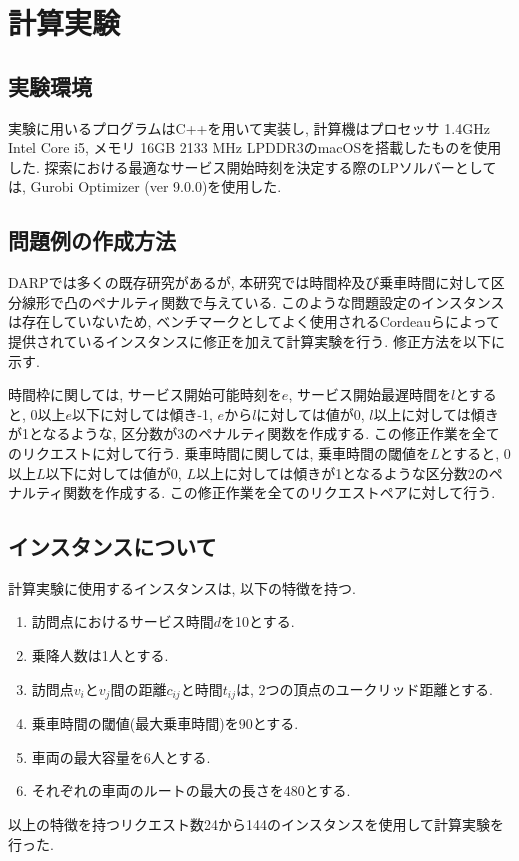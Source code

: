 \chapter{計算実験}\label{computational_result}
\section{実験環境}
実験に用いるプログラムはC++を用いて実装し, 計算機はプロセッサ 1.4GHz Intel Core i5, メモリ 16GB 2133 MHz LPDDR3のmacOSを搭載したものを使用した. 探索における最適なサービス開始時刻を決定する際のLPソルバーとしては, Gurobi Optimizer (ver 9.0.0)を使用した.

\section{問題例の作成方法}
DARPでは多くの既存研究があるが, 本研究では時間枠及び乗車時間に対して区分線形で凸のペナルティ関数で与えている. このような問題設定のインスタンスは存在していないため, ベンチマークとしてよく使用されるCordeauらによって提供されている\cite{tabu}インスタンスに修正を加えて計算実験を行う. 修正方法を以下に示す.

時間枠に関しては, サービス開始可能時刻を$e$, サービス開始最遅時間を$l$とすると, 0以上$e$以下に対しては傾き-1, $e$から$l$に対しては値が0, $l$以上に対しては傾きが1となるような, 区分数が3のペナルティ関数を作成する. この修正作業を全てのリクエストに対して行う. 乗車時間に関しては, 乗車時間の閾値を$L$とすると, 0以上$L$以下に対しては値が0, $L$以上に対しては傾きが1となるような区分数2のペナルティ関数を作成する. この修正作業を全てのリクエストペアに対して行う.
\section{インスタンスについて}
計算実験に使用するインスタンスは, 以下の特徴を持つ.
\begin{enumerate}
 \item 訪問点におけるサービス時間$d$を10とする.
 \item 乗降人数は1人とする.
 \item 訪問点$v_i$と$v_j$間の距離$c_{ij}$と時間$t_{ij}$は, 2つの頂点のユークリッド距離とする.
 \item 乗車時間の閾値(最大乗車時間)を90とする.
 \item 車両の最大容量を6人とする.
 \item それぞれの車両のルートの最大の長さを480とする.
\end{enumerate}
以上の特徴を持つリクエスト数24から144のインスタンスを使用して計算実験を行った.
